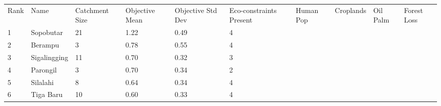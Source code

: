 \begin{table}[ht]
\centering
\begingroup\fontsize{8pt}{9pt}\selectfont
\begin{tabular}{C{0.03\textwidth}C{0.12\textwidth}C{0.09\textwidth}C{0.08\textwidth}C{0.08\textwidth}C{0.08\textwidth}C{0.07\textwidth}C{0.07\textwidth}C{0.07\textwidth}C{0.07\textwidth}}
 Rank & Name & Catchment Size & Objective Mean & Objective Std Dev & Eco-constraints  Present & Human Pop & Croplands & Oil Palm & Forest Loss \\ 
 {1} & Sopobutar &  21 & \textcolor[HTML]{FFFFFF}{1.22} & \textcolor[HTML]{FFFFFF}{0.49} & \textcolor[HTML]{FFFFFF}{4} &  &  &  &  \\ 
  {2} & Berampu &   3 & \textcolor[HTML]{000000}{0.78} & \textcolor[HTML]{FFFFFF}{0.55} & \textcolor[HTML]{FFFFFF}{4} &  &  &  &  \\ 
  {3} & Sigalingging &  11 & \textcolor[HTML]{000000}{0.70} & \textcolor[HTML]{000000}{0.32} & \textcolor[HTML]{000000}{3} &  &  &  &  \\ 
  {4} & Parongil &   3 & \textcolor[HTML]{000000}{0.70} & \textcolor[HTML]{000000}{0.34} & \textcolor[HTML]{000000}{2} &  &  &  &  \\ 
  {5} & Silalahi &   8 & \textcolor[HTML]{000000}{0.64} & \textcolor[HTML]{000000}{0.34} & \textcolor[HTML]{FFFFFF}{4} &  &  &  &  \\ 
  {6} & Tiga Baru &  10 & \textcolor[HTML]{000000}{0.60} & \textcolor[HTML]{000000}{0.33} & \textcolor[HTML]{FFFFFF}{4} &  &  &  &  \\ 

\end{tabular}
\end{table}
